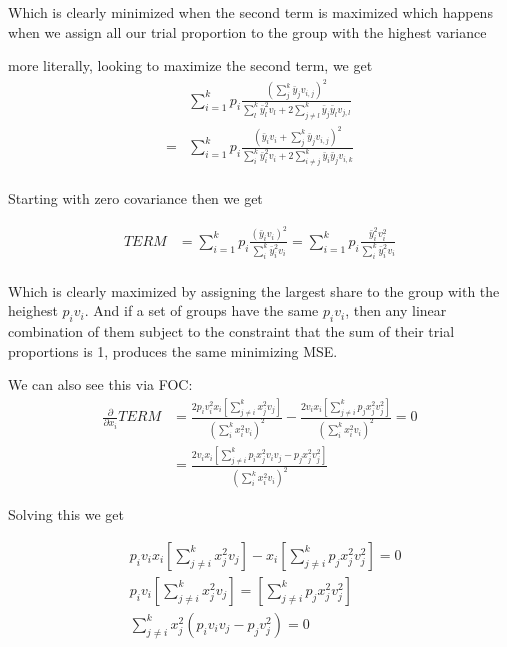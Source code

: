 Which is clearly minimized when the second term is maximized which happens when we assign all our trial proportion to the group with the highest variance


more literally, looking to maximize the second term, we get
\begin{align*}
	&\sum_{i=1}^k p_i \frac{(\sum_{j}^{k} \bar{y}_j v_{i,j} )^2}{\sum_l^k \bar{y}_l^2 v_l + 2 \sum_{j \neq l}^k \bar{y}_j\bar{y}_l v_{j,l} }  \\
	=&\sum_{i=1}^k p_i \frac{(\bar{y}_i v_{i} + \sum_{j}^{k} \bar{y}_j v_{i,j} )^2}{\sum_i^k \bar{y}_i^2 v_i + 2 \sum_{i \neq j}^k \bar{y}_i\bar{y}_j v_{i,k} }  \\
\end{align*} 

Starting with zero covariance then we get

\begin{align*}
	TERM &= \sum_{i=1}^k p_i \frac{(\bar{y}_i v_{i})^2}{\sum_i^k \bar{y}_i^2 v_i } = \sum_{i=1}^k p_i \frac{\bar{y}_i^2 v_{i}^2}{\sum_i^k \bar{y}_i^2 v_i }  \\
\end{align*}

Which is clearly maximized by assigning the largest share to the group with the heighest $p_i v_{i}$. And if a set of groups have the same $p_i v_{i}$, then any linear combination of them subject to the constraint that the sum of their trial proportions is 1, produces the same minimizing MSE.

We can also see this via FOC:
\begin{align*}
	\frac{\partial}{\partial x_i} TERM &=
	\frac{2 p_i v_i^2 x_i [\sum_{j \neq i}^k x_j^2 v_j]}{(\sum_i^k x_i^2 v_i)^2}  
	 - \frac{2 v_i x_i [\sum_{j \neq i}^k p_j x_j^2 v_j^2]}{(\sum_i^k x_i^2 v_i)^2}  = 0 \\
									   &=\frac{2 v_i x_i [\sum_{j \neq i}^k  p_i x_j^2 v_iv_j - p_j x_j^2 v_j^2]}{(\sum_i^k x_i^2 v_i)^2}
\end{align*} 

Solving this we get

\begin{align*}
	&p_i v_i x_i [\sum_{j \neq i}^k x_j^2 v_j] - x_i [\sum_{j \neq i}^k p_j x_j^2 v_j^2] = 0 \\
	&p_i v_i [\sum_{j \neq i}^k x_j^2 v_j] = [\sum_{j \neq i}^k p_j x_j^2 v_j^2] \\
	& \sum_{j \neq i}^k x_j^2(p_i v_i v_j - p_j v_j^2) = 0
\end{align*} 

